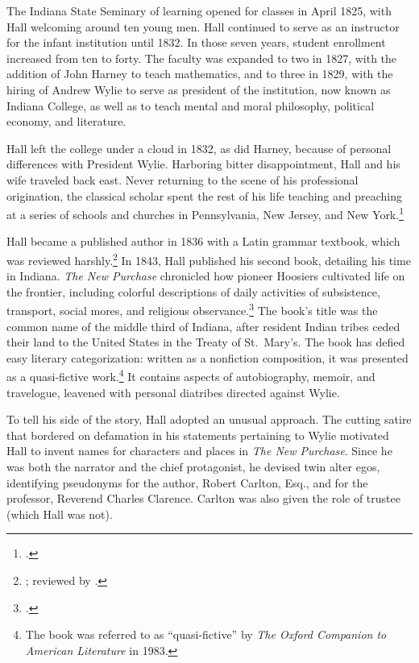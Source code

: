 \documentclass[
  american,
  letterpaper,
]{scrreprt}
\begin{document}
The Indiana State Seminary of learning opened for classes in April 1825,
with Hall welcoming around ten young men. Hall continued to serve as an
instructor for the infant institution until 1832. In those seven years,
student enrollment increased from ten to forty. The faculty was expanded
to two in 1827, with the addition of John Harney to teach mathematics,
and to three in 1829, with the hiring of Andrew Wylie to serve as
president of the institution, now known as Indiana College, as well as
to teach mental and moral philosophy, political economy, and literature.

Hall left the college under a cloud in 1832, as did Harney, because of
personal differences with President Wylie. Harboring bitter
disappointment, Hall and his wife traveled back east. Never returning to
the scene of his professional origination, the classical scholar spent
the rest of his life teaching and preaching at a series of schools and
churches in Pennsylvania, New Jersey, and New York.\footnote{.}

Hall became a published author in 1836 with a Latin grammar textbook,
which was reviewed harshly.\footnote{; reviewed by .} In 1843, Hall published his second book, detailing
his time in Indiana. \emph{The New Purchase} chronicled how pioneer
Hoosiers cultivated life on the frontier, including colorful
descriptions of daily activities of subsistence, transport, social
mores, and religious observance.\footnote{.} The book's title was the common name of the middle third of
Indiana, after resident Indian tribes ceded their land to the United
States in the Treaty of St.~Mary's. The book has defied easy literary
categorization: written as a nonfiction composition, it was presented as
a quasi-fictive work.\footnote{The book was referred to as
  ``quasi-fictive'' by \emph{The Oxford Companion to American
  Literature} in 1983.} It contains aspects of autobiography, memoir,
and travelogue, leavened with personal diatribes directed against Wylie.

To tell his side of the story, Hall adopted an unusual approach. The
cutting satire that bordered on defamation in his statements pertaining
to Wylie motivated Hall to invent names for characters and places in
\emph{The New Purchase}. Since he was both the narrator and the chief
protagonist, he devised twin alter egos, identifying pseudonyms for the
author, Robert Carlton, Esq., and for the professor, Reverend Charles
Clarence. Carlton was also given the role of trustee (which Hall was
not).
\end{document}
